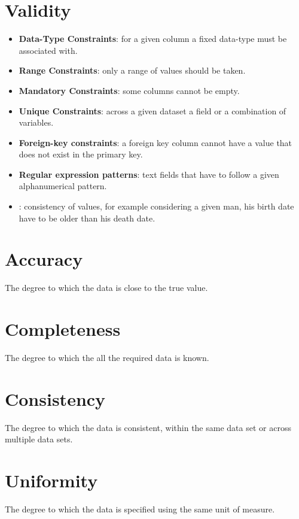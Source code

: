 \section{Validity}
\begin{itemize}
    \item \textbf{Data-Type Constraints}: for a given column a fixed data-type must be associated with.
    \item \textbf{Range Constraints}: only a range of values should be taken.
    \item \textbf{Mandatory Constraints}: some columns cannot be empty.
    \item \textbf{Unique Constraints}: across a given dataset a field or a combination of variables.
    \item \textbf{Foreign-key constraints}: a foreign key column cannot have a value that
        does not exist in the primary key.
    \item \textbf{Regular expression patterns}: text fields that have to follow a given
        alphanumerical pattern.
    \item {}: consistency of values, for example considering
        a given man, his birth date have to be older than his death date.
\end{itemize}

\section{Accuracy}
The degree to which the data is close to the true value.

\section{Completeness}
The degree to which the all the required data is known.

\section{Consistency}
The degree to which the data is consistent, within the same data set or across multiple
data sets.

\section{Uniformity}
The degree to which the data is specified using the same unit of measure.
